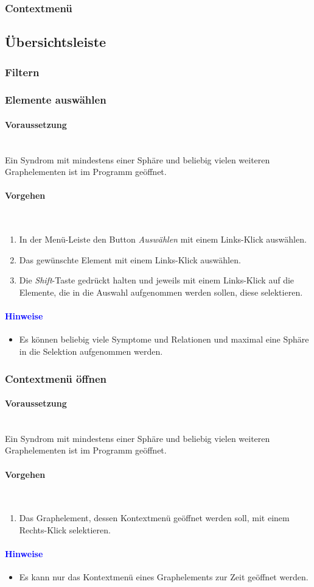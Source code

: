 \documentclass[enabledeprecatedfontcommands,fontsize=11pt,paper=a4,twoside]{scrartcl}
\newcounter{one}
\newcommand*{\hint}{\paragraph{\textcolor{blue}{Hinweise}}}
\newcommand*{\condition}{\paragraph{Voraussetzung}$\;$ \vspace{0.2cm}\\}
\newcommand*{\actions}{\paragraph{Vorgehen} $\;$\vspace{0.2cm}\\}
\begin{document}
		\subsubsection{Contextmenü}
	\subsection{Übersichtsleiste} \label{overwiew}
		\subsubsection{Filtern}
		
				
			\newpage
		\subsubsection{Elemente auswählen}
		\condition 	
		Ein Syndrom mit mindestens einer Sphäre und beliebig vielen weiteren Graphelementen ist im Programm geöffnet.
		\actions
		\begin{enumerate}
				\item In der Menü-Leiste den Button \textit{Auswählen} mit einem Links-Klick auswählen.
				\item Das gewünschte Element mit einem Links-Klick auswählen. 
				\item Die \textit{Shift}-Taste gedrückt halten und jeweils mit einem Links-Klick auf die Elemente, die in die Auswahl aufgenommen werden sollen, diese selektieren.
		\end{enumerate}
		\hint
		\begin{itemize}
				\item Es können beliebig viele Symptome und Relationen und maximal eine Sphäre in die Selektion aufgenommen werden.
	 	\end{itemize}
					
				\newpage
		\subsubsection{Contextmenü öffnen}
		\condition 	
		Ein Syndrom mit mindestens einer Sphäre und beliebig vielen weiteren Graphelementen ist im Programm geöffnet.
		\actions
		\begin{enumerate}
				\item Das Graphelement, dessen Kontextmenü geöffnet werden soll, mit einem Rechts-Klick selektieren.
		\end{enumerate}
		\hint
		\begin{itemize}
				\item Es kann nur das Kontextmenü eines Graphelements zur Zeit geöffnet werden.
	 	\end{itemize}		
		
\end{document}
